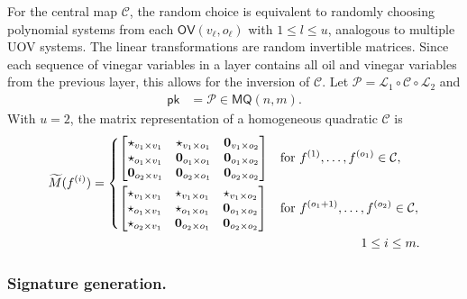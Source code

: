 \documentclass[12pt, a4paper, oneside]{memoir}
\theoremstyle{definition}
\begin{document}
For the central map $\mathcal{C}$, the random choice is equivalent to randomly choosing polynomial systems from each $\mathsf{OV}(v_{\ell}, o_{\ell})$ with $1 \leq l \leq u$, analogous to multiple UOV systems. The linear transformations are random invertible matrices. Since each sequence of vinegar variables in a layer contains all oil and vinegar variables from the previous layer, this allows for the inversion of $\mathcal{C}$. Let $\mathcal{P} = \mathcal{L}_{1} \circ \mathcal{C} \circ \mathcal{L}_{2}$ and
\begin{align}
  \mathsf{pk} &= \mathcal{P} \in \mathsf{MQ}(n, m).
\end{align}
With $u = 2$, the matrix representation of a homogeneous quadratic $\mathcal{C}$ is
\begin{align}
  \begin{split}
    \widetilde{M}(f^{(i)}) =
    \begin{dcases}
      \begin{bmatrix}
        \star_{v_{1} \times v_{1}}      & \star_{v_{1} \times o_{1}}      & \mathbf{0}_{v_{1} \times o_{2}} \\
        \star_{o_{1} \times v_{1}}      & \mathbf{0}_{o_{1} \times o_{1}} & \mathbf{0}_{o_{1} \times o_{2}} \\
        \mathbf{0}_{o_{2} \times v_{1}} & \mathbf{0}_{o_{2} \times o_{1}} & \mathbf{0}_{o_{2} \times o_{2}} \\
      \end{bmatrix} & \text{for } f^{(1)}, \dots, f^{(o_{1})} \in \mathcal{C}, \\
      \begin{bmatrix}
        \star_{v_{1} \times v_{1}}      & \star_{v_{1} \times o_{1}}      & \star_{v_{1} \times o_{2}} \\
        \star_{o_{1} \times v_{1}}      & \star_{o_{1} \times o_{1}}      & \mathbf{0}_{o_{1} \times o_{2}} \\
        \star_{o_{2} \times v_{1}}      & \mathbf{0}_{o_{2} \times o_{1}} & \mathbf{0}_{o_{2} \times o_{2}} \\
      \end{bmatrix} & \text{for } f^{(o_{1} + 1)}, \dots, f^{(o_{2})} \in \mathcal{C},
    \end{dcases} \\
    1 \leq i \leq m.
  \end{split}
\end{align}

\subsubsection{Signature generation.}
\end{document}
